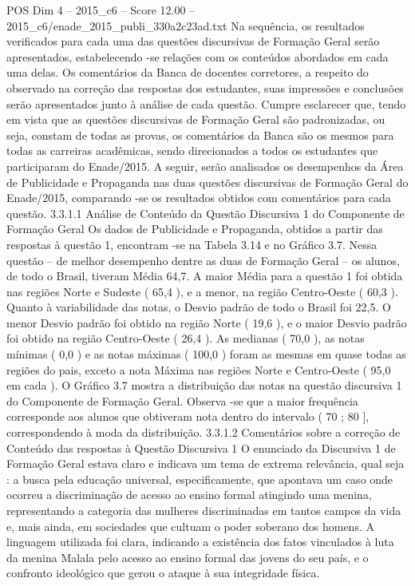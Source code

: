 \begin{textsample}{POS Dim 4 – 2015\_c6 – Score 12.00 – 2015\_c6/enade\_2015\_publi\_330a2c23ad.txt}
Na sequência, os resultados verificados para cada uma das questões discursivas de Formação Geral serão apresentados, estabelecendo -se relações com os conteúdos abordados em cada uma delas.
Os comentários da Banca de docentes corretores, a respeito do observado na correção das respostas dos estudantes, suas impressões e conclusões serão apresentados junto à análise de cada questão.
Cumpre esclarecer que, tendo em vista que as questões discursivas de Formação Geral são padronizadas, ou seja, constam de todas as provas, os comentários da Banca são os mesmos para todas as carreiras acadêmicas, sendo direcionados a todos os estudantes que participaram do Enade/2015.
A seguir, serão analisados os desempenhos da Área de Publicidade e Propaganda nas duas questões discursivas de Formação Geral do Enade/2015, comparando -se os resultados obtidos com comentários para cada questão. 3.3.1.1 Análise de Conteúdo da Questão Discursiva 1 do Componente de Formação Geral Os dados de Publicidade e Propaganda, obtidos a partir das respostas à questão 1, encontram -se na Tabela 3.14 e no Gráfico 3.7.
Nessa questão – de melhor desempenho dentre as duas de Formação Geral – os alunos, de todo o Brasil, tiveram Média 64,7.
A maior Média para a questão 1 foi obtida nas regiões Norte e Sudeste ( 65,4 ), e a menor, na região Centro-Oeste ( 60,3 ).
Quanto à variabilidade das notas, o Desvio padrão de todo o Brasil foi 22,5.
O menor Desvio padrão foi obtido na região Norte ( 19,6 ), e o maior Desvio padrão foi obtido na região Centro-Oeste ( 26,4 ).
As medianas ( 70,0 ), as notas mínimas ( 0,0 ) e as notas máximas ( 100,0 ) foram as mesmas em quase todas as regiões do pais, exceto a nota Máxima nas regiões Norte e Centro-Oeste ( 95,0 em cada ).
O Gráfico 3.7 mostra a distribuição das notas na questão discursiva 1 do Componente de Formação Geral.
Observa -se que a maior frequência corresponde aos alunos que obtiveram nota dentro do intervalo ( 70 ; 80 ], correspondendo à moda da distribuição. 3.3.1.2 Comentários sobre a correção de Conteúdo das respostas à Questão Discursiva 1 O enunciado da Discursiva 1 de Formação Geral estava claro e indicava um tema de extrema relevância, qual seja : a busca pela educação universal, especificamente, que apontava um caso onde ocorreu a discriminação de acesso ao ensino formal atingindo uma menina, representando a categoria das mulheres discriminadas em tantos campos da vida e, mais ainda, em sociedades que cultuam o poder soberano dos homens.
A linguagem utilizada foi clara, indicando a existência dos fatos vinculados à luta da menina Malala pelo acesso ao ensino formal das jovens do seu país, e o confronto ideológico que gerou o ataque à sua integridade física.

\end{textsample}
